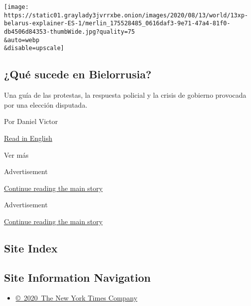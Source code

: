 \begin{enumerate}
  \texttt{[image: https://static01.graylady3jvrrxbe.onion/images/2020/08/13/world/13xp-belarus-explainer-ES-1/merlin\_175528485\_0616daf3-9e71-47a4-81f0-db4506d84353-thumbWide.jpg?quality=75\\\&auto=webp\\\&disable=upscale]}

  \hypertarget{quuxe9-sucede-en-bielorrusia}{%
  \subsection{¿Qué sucede en
  Bielorrusia?}\label{quuxe9-sucede-en-bielorrusia}}

  Una guía de las protestas, la respuesta policial y la crisis de
  gobierno provocada por una elección disputada.

  Por Daniel Victor

  \href{https://www.nytimes3xbfgragh.onion/2020/08/13/world/europe/belarus-protests-guide.html}{Read
  in English}
\end{enumerate}

Ver más

Advertisement

\protect\hyperlink{after-mid2}{Continue reading the main story}

Advertisement

\protect\hyperlink{after-mktg}{Continue reading the main story}

\hypertarget{site-index}{%
\subsection{Site Index}\label{site-index}}

\hypertarget{site-information-navigation}{%
\subsection{Site Information
Navigation}\label{site-information-navigation}}

\begin{itemize}
\tightlist
\item
  \href{https://help.nytimes3xbfgragh.onion/hc/en-us/articles/115014792127-Copyright-notice}{©~2020~The
  New York Times Company}
\end{itemize}

